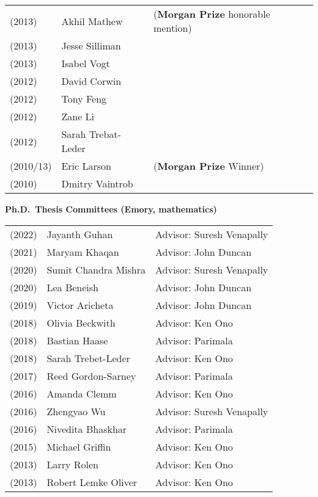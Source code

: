 \documentclass[margin,line]{res}
\begin{document}
\begin{resume}
\begin{tabular}{lll}
(2013) & Akhil Mathew  & (\textbf{Morgan Prize} honorable mention)  \\
(2013) & Jesse Silliman & \\
(2013) & Isabel Vogt & \\

(2012) & David Corwin & \\
(2012) & Tony Feng & \\
(2012) & Zane Li & \\
(2012) & Sarah Trebat-Leder & \\

(2010/13) & Eric Larson  & (\textbf{Morgan Prize} Winner) \\
(2010) & Dmitry Vaintrob & \\
\end{tabular}




{\bf Ph.D.~Thesis Committees (Emory, mathematics)}
\vspace*{-.15in}

\begin{tabular}{lll}
(2022) & Jayanth Guhan & Advisor: Suresh Venapally\\    
(2021) & Maryam Khaqan & Advisor: John Duncan\\    
(2020) & Sumit Chandra Mishra & Advisor: Suresh Venapally\\  
(2020) & Lea Beneish & Advisor: John Duncan\\
(2019) & Victor Aricheta & Advisor: John Duncan\\
(2018) & Olivia Beckwith & Advisor: Ken Ono\\
(2018) & Bastian Haase & Advisor: Parimala\\
(2018) & Sarah Trebet-Leder & Advisor: Ken Ono\\
(2017) & Reed Gordon-Sarney & Advisor: Parimala\\
(2016) & Amanda Clemm & Advisor: Ken Ono\\
(2016) & Zhengyao Wu & Advisor: Suresh Venapally\\
(2016) & Nivedita Bhaskhar & Advisor: Parimala\\
(2015) & Michael Griffin & Advisor: Ken Ono\\
(2013) & Larry Rolen & Advisor: Ken Ono\\
(2013) & Robert Lemke Oliver & Advisor: Ken Ono\\
\end{tabular}




\end{resume}
\end{document}
